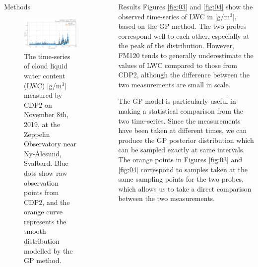 \documentclass[final]{beamer}
\newlength{\sepwidth}
\newlength{\colwidth}
\newcommand{\separatorcolumn}{\begin{column}{\sepwidth}\end{column}}
\begin{document}
\begin{frame}[t]
\begin{columns}[t]
\begin{column}{\colwidth}
\begin{block}{Methods}
    \begin{figure}
        \centering
        \includegraphics[width=\colwidth]{img/lwc_raw.png}
        \caption{ The time-series of cloud liquid water content (LWC) [g/m$^3$] measured by CDP2 on November 8th, 2019, at the Zeppelin Observatory near Ny-\r{A}lesund, Svalbard. Blue dots show raw observation points from CDP2, and the orange curve represents the smooth distribution modelled by the GP method. }
        \label{fig:02}
    \end{figure}
  \end{block}

\end{column}

\separatorcolumn

\begin{column}{\colwidth}

  \begin{block}{Results}
    Figures \ref{fig:03} and \ref{fig:04} show the observed time-series of LWC in [g/m$^3$], based on the GP method. The two probes correspond well to each other, especially at the peak of the distribution. However, FM120 tends to generally underestimate the values of LWC compared to those from CDP2, although the difference between the two measurements are small in scale.

    The GP model is particularly useful in making a statistical comparison from the two time-series. Since the measurements have been taken at different times, we can produce the GP posterior distribution which can be sampled exactly at same intervals. The orange points in Figures \ref{fig:03} and \ref{fig:04} correspond to samples taken at the same sampling points for the two probes, which allows us to take a direct comparison between the two measurements.


\end{block}
\end{column}
\end{columns}
\end{frame}
\end{document}
